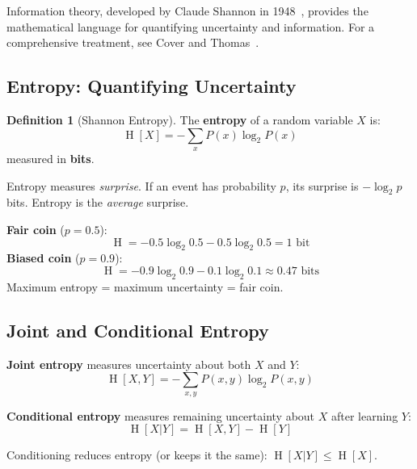 \documentclass[11pt,a4paper]{article}
\theoremstyle{definition}
\newtheorem{definition}{Definition}[section]
\theoremstyle{plain}
\DeclareMathOperator{\Ent}{H}
\begin{document}
Information theory, developed by Claude Shannon in 1948~\cite{shannon1948mathematical}, provides the mathematical language for quantifying uncertainty and information. For a comprehensive treatment, see Cover and Thomas~\cite{cover2006elements}.

\subsection{Entropy: Quantifying Uncertainty}

\begin{definition}[Shannon Entropy]
The \textbf{entropy} of a random variable $X$ is:
\begin{equation}
    \Ent[X] = -\sum_{x} P(x) \log_2 P(x)
\end{equation}
measured in \textbf{bits}.
\end{definition}

\begin{intuition}
Entropy measures \emph{surprise}. If an event has probability $p$, its surprise is $-\log_2 p$ bits. Entropy is the \emph{average} surprise.
\end{intuition}

\begin{example}[title=Entropy of a Coin]
\textbf{Fair coin} ($p = 0.5$):
\[
    \Ent = -0.5 \log_2 0.5 - 0.5 \log_2 0.5 = 1 \text{ bit}
\]
\textbf{Biased coin} ($p = 0.9$):
\[
    \Ent = -0.9 \log_2 0.9 - 0.1 \log_2 0.1 \approx 0.47 \text{ bits}
\]
Maximum entropy = maximum uncertainty = fair coin.
\end{example}

\subsection{Joint and Conditional Entropy}

\textbf{Joint entropy} measures uncertainty about both $X$ and $Y$:
\begin{equation}
    \Ent[X, Y] = -\sum_{x,y} P(x, y) \log_2 P(x, y)
\end{equation}

\textbf{Conditional entropy} measures remaining uncertainty about $X$ after learning $Y$:
\begin{equation}
    \Ent[X | Y] = \Ent[X, Y] - \Ent[Y]
\end{equation}

\begin{keyidea}
Conditioning reduces entropy (or keeps it the same): $\Ent[X|Y] \leq \Ent[X]$.
\end{keyidea}
\end{document}
